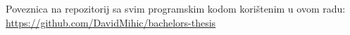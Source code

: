 \label{ch:prilozi}

Poveznica na repozitorij sa svim programskim kodom korištenim u ovom radu: \\
\url{https://github.com/DavidMihic/bachelors-thesis}
